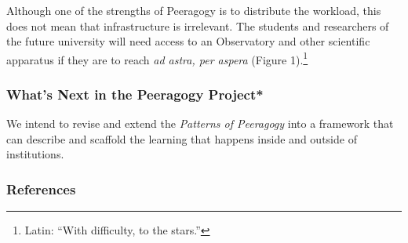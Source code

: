 Although one of the strengths of {{Peeragogy}} is to distribute the
workload, this does not mean that infrastructure is irrelevant. The
students and researchers of the future university will need access to an
Observatory and other scientific apparatus if they are to reach \emph{ad
astra, per aspera} (Figure 1).\footnote{Latin: ``With difficulty, to the
  stars.''}

\hypertarget{whats-next-in-the-peeragogy-project}{%
\subsubsection{What's Next in the Peeragogy
Project*}\label{whats-next-in-the-peeragogy-project}}

We intend to revise and extend the \emph{Patterns of Peeragogy} into a
framework that can describe and scaffold the learning that happens
inside and outside of institutions.

\hypertarget{references}{%
\subsubsection{References}\label{references}}


